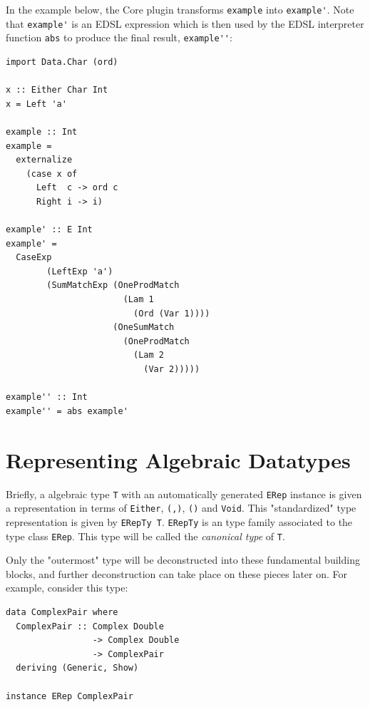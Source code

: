 \documentclass[runningheads, a4paper]{llncs}
\newcommand{\ttt}{\texttt}
\newcommand{\showtodos}{}  %
\newenvironment{todo}
  {\ifthenelse{\isundefined{\showtodos}}{\comment}{\begin{tcolorbox}
    \textbf{TODO}:}}
  {\ifthenelse{\isundefined{\showtodos}}{\endcomment}{\end{tcolorbox}}
  }
\begin{document}
In the example below, the Core plugin transforms \verb|example| into
\verb|example'|. Note that \verb|example'| is an EDSL expression which is then
used by the EDSL interpreter function \verb|abs| to produce the final result,
\verb|example''|:

\begin{lstlisting}[deletekeywords={Ord}]
import Data.Char (ord)

x :: Either Char Int
x = Left 'a'

example :: Int
example =
  externalize
    (case x of
      Left  c -> ord c
      Right i -> i)

example' :: E Int
example' =
  CaseExp
        (LeftExp 'a')
        (SumMatchExp (OneProdMatch
                       (Lam 1
                         (Ord (Var 1))))
                     (OneSumMatch
                       (OneProdMatch
                         (Lam 2
                           (Var 2)))))

example'' :: Int
example'' = abs example'
\end{lstlisting}

\section{Representing Algebraic Datatypes}
\label{sec:ADTRep}


Briefly, a algebraic type \ttt{T} with an automatically generated \ttt{ERep}
instance is given a representation in terms of \ttt{Either}, \ttt{(,)}, \ttt{()}
and \ttt{Void}.  This "standardized" type representation is given by \ttt{ERepTy
T}. \ttt{ERepTy} is an type family associated to the type class \ttt{ERep}. This
type will be called the \textit{canonical type} of \ttt{T}.

Only the "outermost" type will be deconstructed into these fundamental building
blocks, and further deconstruction can take place on these pieces later on. For
example, consider this type:

\begin{lstlisting}
data ComplexPair where
  ComplexPair :: Complex Double
                 -> Complex Double
                 -> ComplexPair
  deriving (Generic, Show)

instance ERep ComplexPair
\end{lstlisting}
\end{document}
